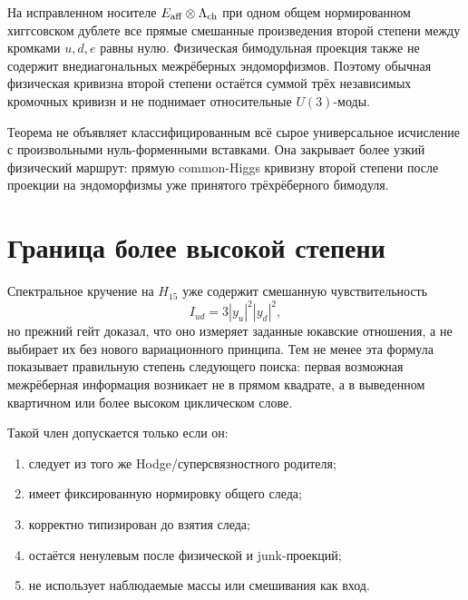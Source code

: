 \begin{theorem}
На исправленном носителе
$E_{\rm aff}\otimes\Lambda_{\rm ch}$ при одном общем нормированном
хиггсовском дублете все прямые смешанные произведения второй степени между
кромками $u,d,e$ равны нулю. Физическая бимодульная проекция также не
содержит внедиагональных межрёберных эндоморфизмов. Поэтому обычная
физическая кривизна второй степени остаётся суммой трёх независимых
кромочных кривизн и не поднимает относительные $U(3)$-моды.
\end{theorem}

\begin{remark}
Теорема не объявляет классифицированным всё сырое универсальное исчисление
с произвольными нуль-форменными вставками. Она закрывает более узкий
физический маршрут: прямую common-Higgs кривизну второй степени после
проекции на эндоморфизмы уже принятого трёхрёберного бимодуля.
\end{remark}

\section{Граница более высокой степени}

Спектральное кручение на $H_{15}$ уже содержит смешанную чувствительность
\begin{equation}
 I_{ud}=3|y_u|^2|y_d|^2,
 \label{eq:v7-torsion-higher-degree-witness}
\end{equation}
но прежний гейт доказал, что оно измеряет заданные юкавские отношения, а
не выбирает их без нового вариационного принципа. Тем не менее эта формула
показывает правильную степень следующего поиска: первая возможная
межрёберная информация возникает не в прямом квадрате, а в выведенном
квартичном или более высоком циклическом слове.

Такой член допускается только если он:
\begin{enumerate}
 \item следует из того же Hodge/суперсвязностного родителя;
 \item имеет фиксированную нормировку общего следа;
 \item корректно типизирован до взятия следа;
 \item остаётся ненулевым после физической и junk-проекций;
 \item не использует наблюдаемые массы или смешивания как вход.
\end{enumerate}


